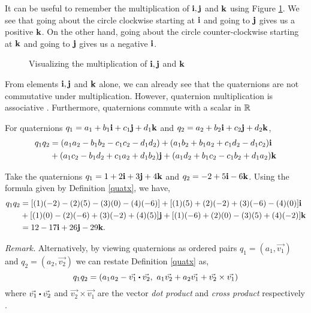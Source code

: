 It can be useful to remember the multiplication of $\textbf{i}, \textbf{j}$ and $\textbf{k}$ using Figure \ref{fig:quatxvis}. We see that going about the circle clockwise starting at $\textbf{i}$ and going to $\textbf{j}$ gives us a positive $\textbf{k}$. On the other hand, going about the circle counter-clockwise starting at $\textbf{k}$ and going to $\textbf{j}$ gives us a negative $\textbf{i}$.

\begin{figure}[H]
	\centering
	\caption{Visualizing the multiplication of $\textbf{i}, \textbf{j}$ and $\textbf{k}$}
	\label{fig:quatxvis}
\end{figure}

From elements $\textbf{i},\textbf{j}$ and $\textbf{k}$ alone, we can already see that the quaternions are not commutative under multiplication. However, quaternion multiplication is associative \cite{lerios}. Furthermore, quaternions commute with a scalar in $\operatorname{\mathbb{R}}$ \cite{lerios}

\begin{definition} \label{quatx}
	\cite{lerios} For quaternions $q_1 = a_1 + b_1\textbf{i} + c_1\textbf{j} + d_1\textbf{k}$ and $q_2 = a_2 + b_2\textbf{i} + c_2\textbf{j} + d_2\textbf{k}$, 
	\begin{align*}
		q_1q_2 &= (a_1a_2 - b_1b_2 - c_1c_2 - d_1d_2) + (a_1b_2 + b_1a_2 + c_1d_2 - d_1c_2)\textbf{i} \\
			   &+ (a_1c_2 - b_1d_2 + c_1a_2 + d_1b_2)\textbf{j} + (a_1d_2 + b_1c_2 - c_1b_2 + d_1a_2)\textbf{k}
	\end{align*}
\end{definition}

\begin{ex} \label{ex:quatx}
	Take the quaternions $q_1 = 1+2\textbf{i}+3\textbf{j}+4\textbf{k}$ and $q_2 = -2+5\textbf{i}-6\textbf{k}$. Using the formula given by Definition \ref{quatx}, we have,
	\begin{align*}
		q_1 q_2 &= [(1)(-2)-(2)(5)-(3)(0)-(4)(-6)] + [(1)(5)+(2)(-2)+(3)(-6)-(4)(0)]\textbf{i} \\
		&+[(1)(0)-(2)(-6)+(3)(-2)+(4)(5)]\textbf{j} + [(1)(-6)+(2)(0)-(3)(5)+(4)(-2)]\textbf{k} \\
		&= 12 - 17\textbf{i} + 26\textbf{j} - 29\textbf{k}.
	\end{align*}
\end{ex}

\textit{Remark.} Alternatively, by viewing quaternions as ordered pairs $q_1 = (a_1,\vec{v_1})$ and $q_2 = (a_2,\vec{v_2})$ we can restate Definition \ref{quatx} as,
\begin{equation} \label{eq:qvectx}
	q_1 q_2 = (a_1a_2 - \vec{v_1}\bigcdot\vec{v_2},\text{ } a_1\vec{v_2}+a_2\vec{v_1}+\vec{v_2}\times\vec{v_1})
\end{equation}
where $\vec{v_1}\bigcdot\vec{v_2}$ and $\vec{v_2}\times\vec{v_1}$ are the vector \emph{dot product} and \emph{cross product} respectively \cite{lerios} \cite{mathoma}.

